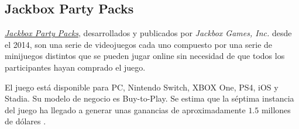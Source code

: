 \subsection{Jackbox Party Packs}

\href{https://www.jackboxgames.com/}{\emph{Jackbox Party Packs}}, desarrollados
y publicados por \emph{Jackbox Games, Inc.} desde el 2014, son una serie de
videojuegos cada uno compuesto por una serie de minijuegos distintos que se
pueden jugar online sin necesidad de que todos los participantes hayan comprado
el juego.

El juego está disponible para PC, Nintendo Switch, XBOX One, PS4, iOS y Stadia.
Su modelo de negocio es Buy-to-Play. Se estima que la séptima instancia del
juego ha llegado a generar unas ganancias de aproximadamente $1.5$ millones de
dólares \cite{noauthor_jackbox_nodate}.

